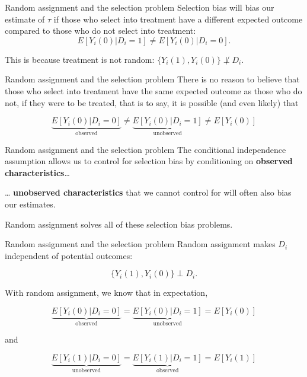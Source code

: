 \documentclass[
  ignorenonframetext,
]{beamer}
\begin{document}
\begin{frame}{Random assignment and the selection problem}
\protect\hypertarget{random-assignment-and-the-selection-problem-2}{}
Selection bias will bias our estimate of \(\tau\) if those who select
into treatment have a different expected outcome compared to those who
do not select into treatment: \[
E[Y_i(0)|D_i=1]\neq E[Y_i(0)|D_i=0].
\]

This is because treatment is not random:
\(\{Y_i(1), Y_i(0)\}\not\perp D_i\).
\end{frame}

\begin{frame}{Random assignment and the selection problem}
\protect\hypertarget{random-assignment-and-the-selection-problem-3}{}
There is no reason to believe that those who select into treatment have
the same expected outcome as those who do not, if they were to be
treated, that is to say, it is possible (and even likely) that

\[
\underbrace{E[Y_i(0)|D_i=0]}_\text{observed}\neq  \underbrace{E[Y_i(0)|D_i=1]}_\text{unobserved}\neq E[Y_i(0)]
\]
\end{frame}

\begin{frame}{Random assignment and the selection problem}
\protect\hypertarget{random-assignment-and-the-selection-problem-4}{}
The conditional independence assumption allows us to control for
selection bias by conditioning on \textbf{observed
characteristics}\ldots{}

\ldots{} \textbf{unobserved characteristics} that we cannot control for
will often also bias our estimates.

Random assignment solves all of these selection bias problems.
\end{frame}

\begin{frame}{Random assignment and the selection problem}
\protect\hypertarget{random-assignment-and-the-selection-problem-5}{}
Random assignment makes \(D_i\) independent of potential outcomes:

\[
\{Y_i(1), Y_i(0)\}\perp  D_i.
\]

With random assignment, we know that in expectation,

\[
\underbrace{E[Y_i(0)|D_i=0]}_\text{observed}=  \underbrace{E[Y_i(0)|D_i=1]}_\text{unobserved}= E[Y_i(0)]
\]

\begin{center}
and
\end{center}

\[
\underbrace{E[Y_i(1)|D_i=0]}_\text{unobserved}= \underbrace{E[Y_i(1)|D_i=1]}_\text{observed}= E[Y_i(1)]
\]
\end{frame}
\end{document}
